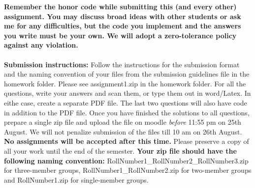 \documentclass[11pt]{article}
\begin{document}
\maketitle

\textbf{Remember the honor code while submitting this (and every other) assignment. You may discuss broad ideas with other students or ask me for any difficulties, but the code you implement and the answers you write must be your own. We will adopt a \textbf{zero-tolerance policy} against any violation.}
\\
\\
\textbf{Submission instructions:} Follow the instructions for the submission format and the naming convention of your files from the submission guidelines file in the homework folder. Please see \textsf{assignment1.zip} in the homework folder. For all the questions, write your answers and scan them, or type them out in word/Latex. In eithe case, create a separate PDF file. The last two questions will also have code in addition to the PDF file. Once you have finished the solutions to all questions, prepare a single zip file and upload the file on moodle \emph{before} 11:55 pm on 25th August.  We will not penalize submission of the files till 10 am on 26th August. \textbf{No assignments will be accepted after this time.} Please preserve a copy of all your work until the end of the semester.  \textbf{Your zip file should have the following naming convention:} RollNumber1\_RollNumber2\_RollNumber3.zip for three-member groups, RollNumber1\_RollNumber2.zip for two-member groups and RollNumber1.zip for single-member groups. 
\end{document}
